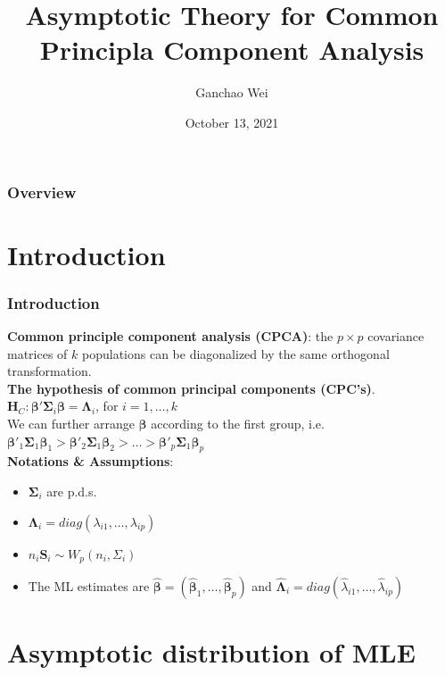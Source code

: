\documentclass{beamer}
\title[CPCA inference]{Asymptotic Theory for Common Principla Component Analysis}
\author{Ganchao Wei}
\date{October 13, 2021}
\begin{document}
	
	\begin{frame}
		\titlepage %
	\end{frame}
	
	\begin{frame}
		\frametitle{Overview} %
		\tableofcontents
	\end{frame}
	
	
	\section{Introduction}
	
	\begin{frame}
		\frametitle{Introduction}
		\textbf{Common principle component analysis (CPCA)}: the $p\times p$ covariance matrices of $k$ populations can be diagonalized by the same orthogonal transformation.\\
		\textbf{The hypothesis of common principal components (CPC's)}.  $\bm{H}_C: \bm{\beta}'\bm{\Sigma}_i\bm{\beta}= \bm{\Lambda}_i$, for $i=1,\ldots,k$\\
		We can further arrange $\bm{\beta}$ according to the first group, i.e. $\bm{\beta}'_1\bm{\Sigma}_1\bm{\beta}_1 > \bm{\beta}'_2\bm{\Sigma}_1\bm{\beta}_2 > \ldots > \bm{\beta}'_p\bm{\Sigma}_1\bm{\beta}_p$\\
		
		\textbf{Notations \& Assumptions}:
		\begin{itemize}
			\item 
			$\bm{\Sigma}_i$ are p.d.s.
			\item
			$\bm{\Lambda}_i = diag(\lambda_{i1},\ldots,\lambda_{ip})$
			\item
			$n_i\bm{S}_i \sim W_p(n_i, \Sigma_i)$
			\item
			The ML estimates are $\hat{\bm{\beta}} = (\hat{\bm{\beta}}_1,\ldots, \hat{\bm{\beta}}_p)$ and $\hat{\bm{\Lambda}}_i = diag(\hat{\lambda}_{i1},\ldots,\hat{\lambda}_{ip})$
		\end{itemize}
	\end{frame}
	
	\section{Asymptotic distribution of MLE}
	
\end{document}
